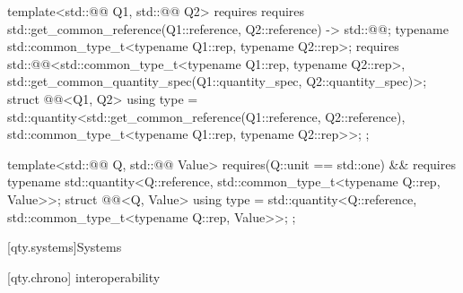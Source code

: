 \begin{codeblock}
template<std::@@ Q1, std::@@ Q2>
  requires requires {
    { std::get_common_reference(Q1::reference, Q2::reference) } -> std::@@;
    typename std::common_type_t<typename Q1::rep, typename Q2::rep>;
    requires std::@@<std::common_type_t<typename Q1::rep, typename Q2::rep>,
                                         std::get_common_quantity_spec(Q1::quantity_spec,
                                                                            Q2::quantity_spec)>;
  }
struct @@<Q1, Q2> {
  using type = std::quantity<std::get_common_reference(Q1::reference, Q2::reference),
                                  std::common_type_t<typename Q1::rep, typename Q2::rep>>;
};

template<std::@@ Q, std::@@ Value>
  requires(Q::unit == std::one) && requires {
    typename std::quantity<Q::reference, std::common_type_t<typename Q::rep, Value>>;
  }
struct @@<Q, Value> {
  using type = std::quantity<Q::reference, std::common_type_t<typename Q::rep, Value>>;
};
\end{codeblock}


[qty.systems]{Systems}

[qty.chrono]{ interoperability}

